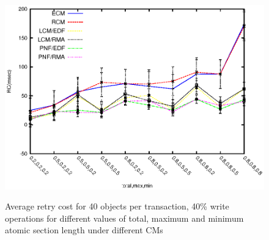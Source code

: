 \documentclass[12pt,english]{report}
\begin{document}
\begin{figure}
{\includegraphics[scale=0.7]
{figures/Abr_dur_20t_420obj_40wr.eps}
\label{fig:20t_ecm_rcm_lcm_pnf_420obj_40wr}
}
\caption{Average retry cost for 40 objects per transaction, 40\% write operations for different values of total, maximum and minimum atomic section length under different CMs}
\label{fig:cm_40obj_per_tx_40wr}
\end{figure}
\end{document}
